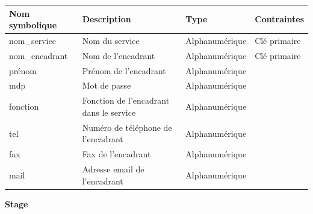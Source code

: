 \documentclass{scrreprt}
\begin{document}
\begin{tabular}{|l|l|l|l|}
\hline
\textbf{Nom symbolique} & \textbf{Description} & \textbf{Type} & \textbf{Contraintes} \\
\hline
nom\_service & Nom du service & Alphanumérique & Clé primaire \\
nom\_encadrant & Nom de l'encadrant & Alphanumérique & Clé primaire \\
prénom & Prénom de l'encadrant & Alphanumérique & \\
mdp & Mot de passe & Alphanumérique & \\
fonction & Fonction de l'encadrant dans le service & Alphanumérique & \\
tel & Numéro de téléphone de l'encadrant & Alphanumérique & \\
fax & Fax de l'encadrant & Alphanumérique & \\
mail & Adresse email de l'encadrant & Alphanumérique & \\
\hline
\end{tabular}

\newpage
\begin{flushleft}
\textbf{Stage}
\end{flushleft}
\end{document}
